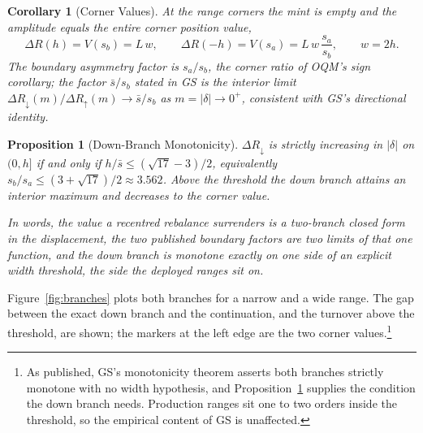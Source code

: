\documentclass[11pt,a4paper]{article}
\theoremstyle{definition}
\theoremstyle{plain}
\newtheorem{proposition}{Proposition}
\newtheorem{corollary}{Corollary}
\theoremstyle{remark}
\begin{document}
\begin{corollary}[Corner Values]\label{cor:corners}
At the range corners the mint is empty and the amplitude equals the entire corner position value,
\[
\Delta R(h) = V(s_b) = L\,w, \qquad
\Delta R(-h) = V(s_a) = L\,w\,\frac{s_a}{s_b}, \qquad w = 2h .
\]
The boundary asymmetry factor is $s_a / s_b$, the corner ratio of OQM's sign corollary; the factor $\bar s / s_b$ stated in GS is the interior limit $\Delta R_{\downarrow}(m)/\Delta R_{\uparrow}(m) \to
\bar s / s_b$ as $m = |\delta| \to 0^+$, consistent with GS's directional identity.
\end{corollary}

\begin{proposition}[Down-Branch Monotonicity]\label{prop:mono}
$\Delta R_{\downarrow}$ is strictly increasing in $|\delta|$ on $(0,h]$ if and only if $h / \bar s \le (\sqrt{17} - 3)/2$, equivalently $s_b / s_a \le (3 + \sqrt{17})/2 \approx 3.562$. Above the threshold
the down branch attains an interior maximum and decreases to the corner value.
\end{proposition}

\emph{In words, the value a recentred rebalance surrenders is a two-branch closed form in the displacement, the two published boundary factors are two limits of that one function, and the down
branch is monotone exactly on one side of an explicit width threshold, the side the deployed ranges sit on.}

Figure~\ref{fig:branches} plots both branches for a narrow and a wide range. The gap between the exact down branch and the continuation, and the turnover above the threshold, are shown; the markers at the left
edge are the two corner values.\footnote{As published, GS's monotonicity theorem asserts both branches strictly monotone with no width hypothesis, and Proposition~\ref{prop:mono} supplies the
condition the down branch needs. Production ranges sit one to two orders inside the threshold, so the empirical content of GS is unaffected.}
\end{document}
